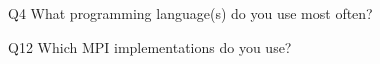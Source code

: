 \begin{description}%
\item{Q4} What programming language(s) do you use most often?%
\item{Q12} Which MPI implementations do you use?%
\end{description}%
